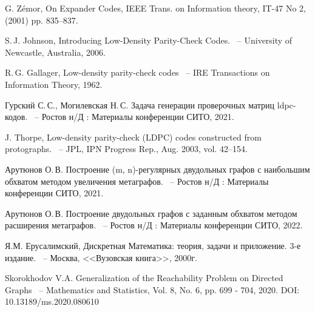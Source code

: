 \documentclass[14pt]{mmcs-article}
\begin{document}
\begin{thebibliography}{0}

G. Zémor, On Expander Codes, IEEE Trans. on Information theory, IT-47
No 2, (2001) pp. 835–837.
  
S.\,J. Johnson,
Introducing Low-Density Parity-Check Codes.
~-- University of Newcastle, Australia, 2006.

R.\,G. Gallager,
Low-density parity-check codes
~-- IRE Transactions on Information Theory, 1962.

Гурский С.\,С., Могилевская Н.\,С.
Задача генерации проверочных матриц ldpc-кодов.
~-- Ростов н/Д : Материалы конференции СИТО, 2021.

J. Thorpe,
Low-density parity-check (LDPC) codes constructed from protographs.
~-- JPL, IPN Progress Rep., Aug. 2003, vol. 42–154.

Арутюнов О.\,В.
Построение (m, n)-регулярных двудольных графов с наибольшим обхватом методом увеличения метаграфов.
~-- Ростов н/Д : Материалы конференции СИТО, 2021.

Арутюнов О.\,В.
Построение двудольных графов с заданным обхватом методом расширения метаграфов.
~-- Ростов н/Д : Материалы конференции СИТО, 2022.

Я.М. Ерусалимский,
Дискретная Математика: теория, задачи и приложение. 3-е издание.
~-- Москва, <<Вузовская книга>>, 2000г.

Skorokhodov V.A. Generalization of the Reachability Problem on Directed Graphs
~-- Mathematics and Statistics, Vol. 8, No. 6, pp. 699 - 704, 2020. DOI: 10.13189/ms.2020.080610

\end{thebibliography}
\end{document}
